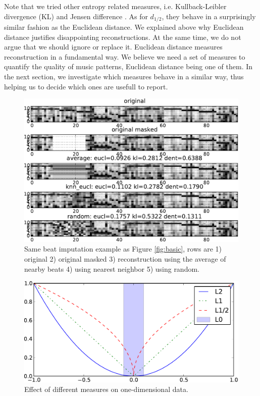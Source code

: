 \documentclass{article}
\begin{document}
Note that we tried other entropy related measures,
i.e. Kullback-Leibler divergence (KL) and Jensen difference
\cite{Michel1994}. As for $d_{1/2}$, they behave in a surprisingly
similar fashion as the Euclidean distance.  We explained above why
Euclidean distance justifies disappointing reconstructions. At the
same time, we do not argue that we should ignore or replace
it. Euclidean distance measures reconstruction in a fundamental
way. We believe we need a set of measures to quantify the quality of
music patterns, Euclidean distance being one of them. In the next
section, we investigate which measures behave in a similar way, thus
helping us to decide which ones are usefull to report.

\begin{figure}[t]
\begin{center}
\includegraphics[width=.95\columnwidth]{avg_nn_rand}
\end{center}
\caption{Same beat imputation example as Figure \ref{fig:basic}, 
rows are 1) original 2) original masked
3) reconstruction using the average of nearby beats 4) using
nearest neighbor 5) using random.
\label{fig:avgnnrand}}
\end{figure}

\begin{figure}[t]
\begin{center}
\includegraphics[width=.85\columnwidth]{measures}
\end{center}
\caption{Effect of different measures on one-dimensional data.
\label{fig:measures}}
\end{figure}
\end{document}
